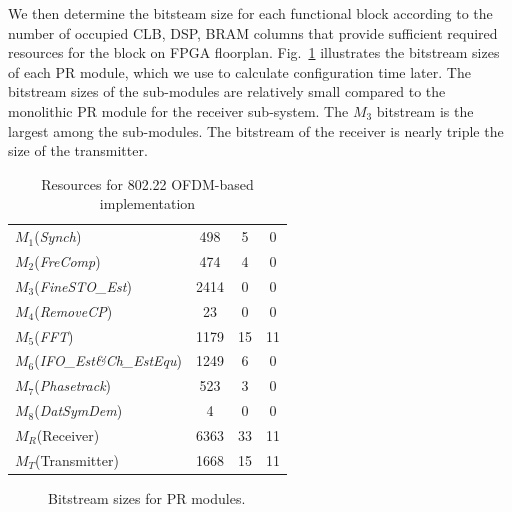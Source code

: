 We then determine the bitsteam size for each functional block according to the number of occupied CLB, DSP, BRAM columns that provide sufficient required resources for the block on FPGA floorplan. %
Fig.~\ref{fig:Bitstream} illustrates the bitstream sizes of each PR module, which we use to calculate configuration time later. The bitstream sizes of the sub-modules are relatively small compared to the monolithic PR module for the receiver sub-system. The $M_3$ bitstream is the largest among the sub-modules. The bitstream of the receiver is nearly triple the size of the transmitter.
\begin{table}[hb]
	\centering
	\caption{Resources for 802.22 OFDM-based implementation}
	\label{tab:Resouces}
	\begin{tabular}{l|c|c|c}
        \hline \hline
    			  \makebox[4.2cm][c]{$modules$}	&  \makebox[2cm][c]{Slices}  &   \makebox[2cm][c]{DSP} &   \makebox[2cm][c]{BRAM} \\
	\hline
		$M_1$(\textit{Synch})     				& 498 		& 5	& 0 \\
		$M_2$(\textit{FreComp})				& 474		& 4 	& 0 \\
		$M_3$(\textit{FineSTO\_Est})			& 2414	& 0 	& 0 \\
		$M_4$(\textit{RemoveCP})			& 23  		& 0	& 0 \\
		$M_5$(\textit{FFT})	  			& 1179  	& 15	& 11 \\
		$M_6$(\textit{IFO\_Est\&Ch\_EstEqu})	  	& 1249 	& 6	& 0 \\
		$M_7$(\textit{Phasetrack})	  		& 523  	& 3	& 0 \\
		$M_8$(\textit{DatSymDem})	  		& 4	  	& 0	& 0 \\
		$M_R$(Receiver)  					& 6363  	& 33	& 11 \\
		$M_T$(Transmitter)					& 1668  	& 15	& 11 \\
	\hline \hline
    \end{tabular}
\end{table}

\begin{figure}
\centering
{}
\caption{Bitstream sizes for PR modules.}
\label{fig:Bitstream}
\end{figure}

